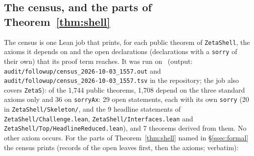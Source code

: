 \subsection{The census, and the parts of Theorem~\ref{thm:shell}}\label{app:lean-census}
The census is one Lean job that prints, for each public theorem of \texttt{ZetaShell}, the axioms it depends on and the open declarations
(declarations with a \texttt{sorry} of their own) that its proof term reaches. It was run on \censusref\ (output:
\texttt{audit/followup/census\_2026-10-03\_1557.out} and \texttt{audit/followup/census\_2026-10-03\_1557.tsv} in the repository; the job also covers \texttt{ZetaS}): of the 1,744 public theorems, 1,708 depend on the three standard axioms only and 36 on \texttt{sorryAx}: 29 open
statements, each with its own \texttt{sorry} (20 in \texttt{ZetaShell/Skeleton/}, and the 9 headline statements of \texttt{ZetaShell/Challenge.lean},
\texttt{ZetaShell/Interfaces.lean} and \texttt{ZetaShell/Top/HeadlineReduced.lean}), and 7 theorems derived from them. No other axiom occurs.
For the parts of Theorem~\ref{thm:shell} named in \S\ref{ssec:formal} the census prints (records of the open leaves first, then the axioms; verbatim):
